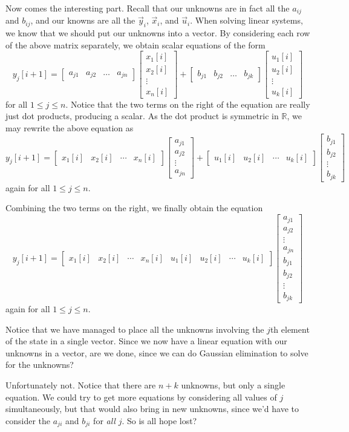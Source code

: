 \documentclass[letterpaper]{article}
\theoremstyle{remark}
\newcommand{\mat}[1]{\ensuremath{\begin{bmatrix}#1\end{bmatrix}}}
\begin{document}
Now comes the interesting part. Recall that our unknowns are in fact all the $a_{ij}$ and $b_{ij}$, and our knowns are all the $\vec{y}_i$, $\vec{x}_i$, and $\vec{u}_i$. When solving linear systems, we know that we should put our unknowns into a vector. By considering each row of the above matrix separately, we obtain scalar equations of the form
\[
    y_j[i + 1] = \mat{a_{j1} & a_{j2} & \ldots & a_{jn}} \mat{x_1[i] \\ x_2[i] \\ \vdots \\ x_n[i] } + \mat{b_{j1} & b_{j2} & \ldots & b_{jk}} \mat{u_1[i] \\ u_2[i] \\ \vdots \\ u_k[i] }
\]
for all $1 \le j \le n$. Notice that the two terms on the right of the equation are really just dot products, producing a scalar. As the dot product is symmetric in $\mathbb{R}$, we may rewrite the above equation as
\[
    y_j[i + 1] = \mat{x_1[i] & x_2[i] & \cdots & x_n[i]} \mat{a_{j1} \\ a_{j2} \\ \vdots \\ a_{jn}}  + \mat{u_1[i] & u_2[i] & \cdots & u_k[i]} \mat{b_{j1} \\ b_{j2} \\ \vdots \\ b_{jk}}
\]
again for all $1 \le j \le n$.

Combining the two terms on the right, we finally obtain the equation
\[
    y_j[i + 1] = \mat{x_1[i] & x_2[i] & \cdots & x_n[i] & u_1[i] & u_2[i] & \cdots & u_k[i]} \mat{a_{j1} \\ a_{j2} \\ \vdots \\ a_{jn} \\ b_{j1} \\ b_{j2} \\ \vdots \\ b_{jk}}
\]
again for all $1 \le j \le n$.

Notice that we have managed to place all the unknowns involving the $j$th element of the state in a single vector. Since we now have a linear equation with our unknowns in a vector, are we done, since we can do Gaussian elimination to solve for the unknowns?

Unfortunately not. Notice that there are $n + k$ unknowns, but only a single equation. We could try to get more equations by considering all values of $j$ simultaneously, but that would also bring in new unknowns, since we'd have to consider the $a_{ji}$ and $b_{ji}$ for \emph{all} $j$. So is all hope lost?
\end{document}
